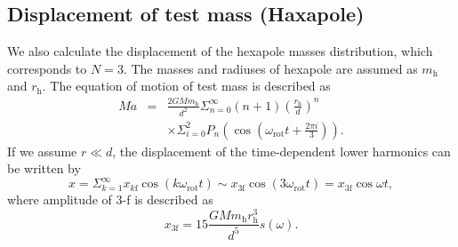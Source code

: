 \documentclass[%
 reprint,
superscriptaddress,
 amsmath,amssymb,
 aps,
]{revtex4-1}
\begin{document}
\subsection{Displacement of test mass (Haxapole)} \label{Hexa}
We also calculate the displacement of the hexapole masses distribution, which corresponds to $N=3$.
The masses and radiuses of hexapole are assumed as $m_{\mathrm{h}}$ and $r_{\mathrm{h}}$. 
The equation of motion of test mass is described as
\begin{eqnarray}
Ma &=& \frac{2GMm_{\mathrm{h}}}{d^2}\Sigma^{\infty}_{n=0}(n+1) \left( \frac{r_{\mathrm{h}}}{d} \right)^n \\
&&\times \Sigma^2_{i=0} P_n \left(\cos{\left(\omega_{\mathrm{rot}} t+\frac{2\pi i}{3} \right)} \right).
\end{eqnarray} 
If we assume $r \ll d$, the displacement of the time-dependent lower harmonics can be written by 
\begin{equation}
x=\Sigma_{k=1}^{\infty}x_{k\mathrm{f}}\cos(k\omega_{\mathrm{rot}} t)\sim  x_{3\mathrm{f}}\cos(3\omega_{\mathrm{rot}} t)=x_{\mathrm{3f}}\cos{\omega t},
\end{equation}
where amplitude of 3-f is described as
\begin{equation}
 x_{3\mathrm{f}}=15\frac{GMm_{\mathrm{h}}r_{\mathrm{h}}^3}{d^5}s(\omega). \label{3f}
\end{equation}
\end{document}
